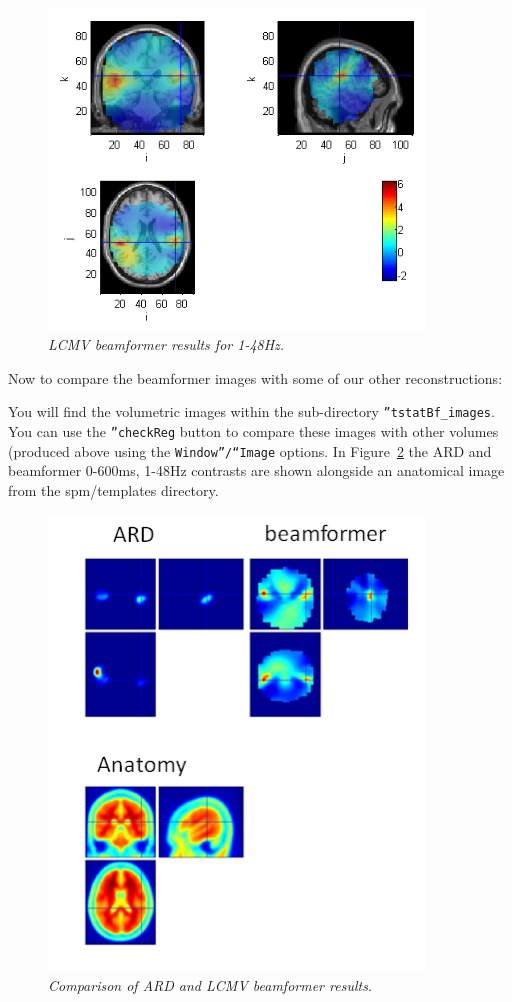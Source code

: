 \begin{figure}
\begin{center}
\includegraphics[width=100mm]{meg_sloc/slide11}
\caption{\em LCMV beamformer results for 1-48Hz.\label{meg_sloc:fig:11}}
\end{center}
\end{figure}

Now to compare the beamformer images with some of our other reconstructions:

You will find the volumetric images within the sub-directory \texttt{''tstatBf\_images}. You can use the \texttt{''checkReg} button to compare these images with other volumes (produced above using the \texttt{Window''/``Image} options. In Figure~\ref{meg_sloc:fig:12} the ARD and beamformer 0-600ms, 1-48Hz contrasts are shown alongside an anatomical image from the spm/templates directory.

\begin{figure}
\begin{center}
\includegraphics[width=100mm]{meg_sloc/slide12}
\caption{\em Comparison of ARD and LCMV beamformer results.\label{meg_sloc:fig:12}}
\end{center}
\end{figure}

